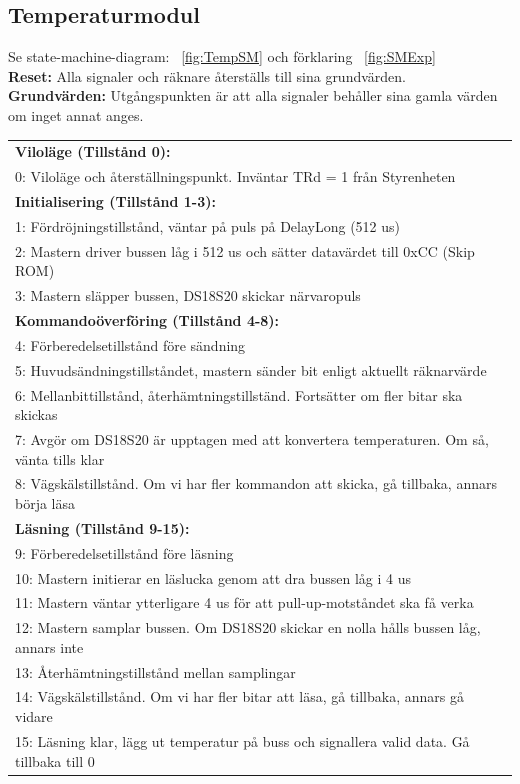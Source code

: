 \documentclass[a4paper,11pt]{article}
\begin{document}
		\subsection{Temperaturmodul}
			Se state-machine-diagram: ~\ref{fig:TempSM} och förklaring ~\ref{fig:SMExp}\\
			{\bf Reset:} Alla signaler och räknare återställs till sina grundvärden.\\
			{\bf Grundvärden:} Utgångspunkten är att alla signaler behåller sina gamla värden om inget annat anges.\\
			\begin{tabular}{l}
				\\{\bf Viloläge (Tillstånd 0):}\\
				0: Viloläge och återställningspunkt. Inväntar TRd = 1 från Styrenheten\\
				{\bf Initialisering (Tillstånd 1-3):}\\
				1: Fördröjningstillstånd, väntar på puls på DelayLong (512 us)\\
				2: Mastern driver bussen låg i 512 us och sätter datavärdet till 0xCC (Skip ROM)\\
				3: Mastern släpper bussen, DS18S20 skickar närvaropuls\\
				{\bf Kommandoöverföring (Tillstånd 4-8):}\\
				4: Förberedelsetillstånd före sändning\\
				5: Huvudsändningstillståndet, mastern sänder bit enligt aktuellt räknarvärde\\
				6: Mellanbittillstånd, återhämtningstillständ. Fortsätter om fler bitar ska skickas\\
				7: Avgör om DS18S20 är upptagen med att konvertera temperaturen. Om så, vänta tills klar\\
				8: Vägskälstillstånd. Om vi har fler kommandon att skicka, gå tillbaka, annars börja läsa\\
				{\bf Läsning (Tillstånd 9-15):}\\
				9:  Förberedelsetillstånd före läsning\\
				10: Mastern initierar en läslucka genom att dra bussen låg i 4 us\\
				11: Mastern väntar ytterligare 4 us för att pull-up-motståndet ska få verka\\
				12: Mastern samplar bussen. Om DS18S20 skickar en nolla hålls bussen låg, annars inte\\
				13: Återhämtningstillstånd mellan samplingar\\
				14: Vägskälstillstånd. Om vi har fler bitar att läsa, gå tillbaka, annars gå vidare\\
				15: Läsning klar, lägg ut temperatur på buss och signallera valid data. Gå tillbaka till 0\\
			\end{tabular}
\end{document}
